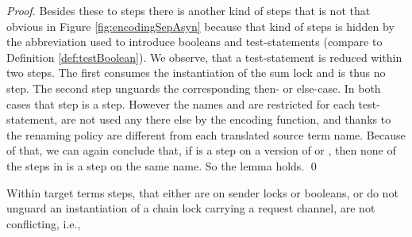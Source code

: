 \documentclass[]{llncs}
\begin{document}
\begin{proof}
	Besides these to steps there is another kind of \pure \admin steps that is not that obvious in Figure \ref{fig:encodingSepAsyn} because that kind of steps is hidden by the abbreviation used to introduce booleans and test-statements (compare to Definition \ref{def:testBoolean}). We observe, that a test-statement is reduced within two steps. The first consumes the instantiation of the sum lock and is thus no \pure \admin step. The second step unguards the corresponding then- or else-case. In both cases that step is a \pure \admin step. However the names  and  are restricted for each test-statement, are not used any there else by the encoding function, and thanks to the renaming policy are different from each translated source term name. Because of that, we can again conclude that, if  is a step on a version of  or , then none of the steps in  is a step on the same name. So the lemma holds.
	\qed
\end{proof}

\begin{lemma} \label{lem:nonConflictingStepsMixAsyn}
	Within target terms \pure \admin steps, that either are on sender locks or booleans, or do not unguard an instantiation of a chain lock carrying a request channel, are not conflicting, i.e.,
	
\end{lemma}
\end{document}
